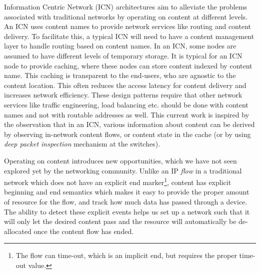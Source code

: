 \documentclass[conference]{IEEEtran}
\begin{document}
Information Centric Network (ICN) architectures aim to
alleviate the problems associated with traditional networks by
operating on content at different levels. An ICN uses content
names to provide network services like routing and content
delivery. To facilitate this, a typical ICN will need to have a
content management layer to handle routing based on content
names. In an ICN, some nodes are assumed to have different
levels of temporary storage. It is typical for an ICN node to
provide caching, where these nodes can store content indexed
by content name. This caching is transparent to the end-users,
who are agnostic to the content location. This often reduces
the access latency for content delivery and increases network
efficiency. These design patterns require that other network
services like traffic engineering, load balancing etc. should be
done with content names and not with routable addresses as
well. This current work is inspired by the observation that
in an ICN, various information about content can be derived
by observing in-network content flows, or content state in the
cache (or by using \emph{deep packet inspection} mechanism at the
switches).

Operating on content introduces new opportunities, which
we have not seen explored yet by the networking community.
Unlike an IP \emph{flow} in a traditional network which does not
have an explicit end marker\footnote{The flow can time-out, which is an implicit end, but requires the proper time-out value.}, content has explicit beginning
and end semantics which makes it easy to provide the proper amount of resource for the flow, and track how much data has
passed through a device. The ability to detect these explicit
events helps us set up a network such that it will only let the
desired content pass and the resource will automatically be
de-allocated once the content flow has ended.
\end{document}
